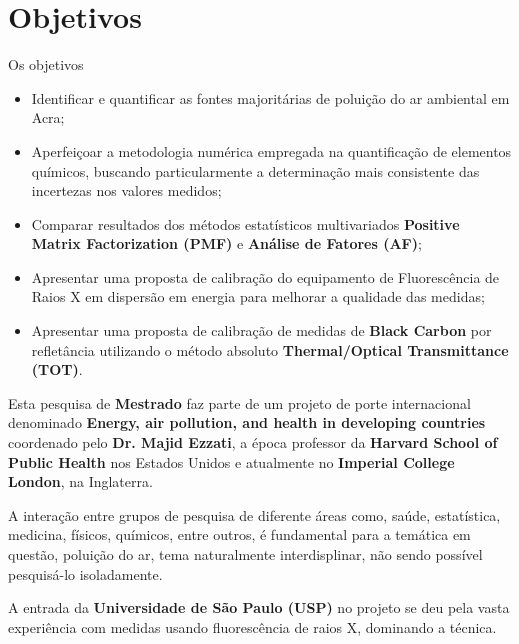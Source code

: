 \section{Objetivos}

Os objetivos 

\begin{itemize}
  \item Identificar e quantificar as fontes majoritárias de poluição do ar ambiental em Acra;
  \item Aperfeiçoar a metodologia numérica empregada na quantificação de elementos químicos, 
        buscando particularmente a determinação mais consistente das incertezas nos valores medidos;
  \item Comparar resultados dos métodos estatísticos multivariados
        \textbf{Positive Matrix Factorization (PMF)} e \textbf{Análise de Fatores (AF)};
  \item Apresentar uma proposta de calibração do equipamento de Fluorescência de Raios X
        em dispersão em energia para melhorar a qualidade das medidas;
  \item Apresentar uma proposta de calibração de medidas de \textbf{Black Carbon} por refletância
        utilizando o método absoluto \textbf{Thermal/Optical Transmittance (TOT)}.
\end{itemize}


Esta pesquisa de \textbf{Mestrado} faz parte de um projeto de porte 
internacional denominado \textbf{Energy, air pollution, and health 
in developing countries} coordenado pelo \textbf{Dr. Majid Ezzati}, 
a época professor da \textbf{Harvard School of Public Health} nos 
Estados Unidos e atualmente no \textbf{Imperial College London}, 
na Inglaterra.  

A interação entre grupos de pesquisa de diferente áreas como, saúde, 
estatística, medicina, físicos, químicos, entre outros, é fundamental
para a temática em questão, poluição do ar, tema naturalmente 
interdisplinar, não sendo possível pesquisá-lo isoladamente. 

A entrada da \textbf{Universidade de São Paulo (USP)} no projeto se deu pela
vasta experiência com medidas usando fluorescência de raios X, dominando a técnica.
